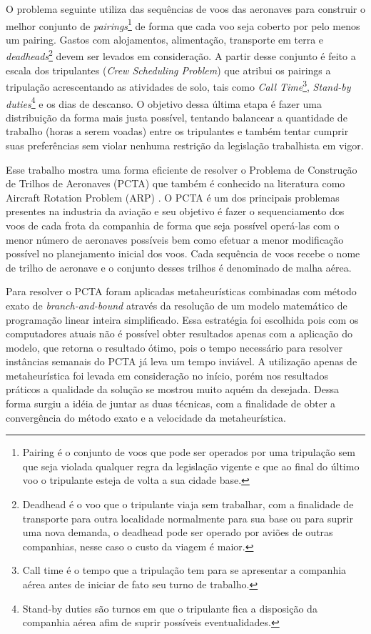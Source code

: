 O problema seguinte utiliza das sequências de voos das aeronaves para construir
o melhor conjunto de \textit{pairings}\footnote{Pairing é o conjunto de voos que
pode ser operados por uma tripulação sem que seja violada qualquer regra da
legislação vigente e que ao final do último voo o tripulante esteja de volta a
sua cidade base.} de forma que cada voo seja coberto por pelo menos um pairing.
Gastos com alojamentos, alimentação, transporte em terra e
\textit{deadheads}\footnote{Deadhead é o voo que o tripulante viaja sem
trabalhar, com a finalidade de transporte para outra localidade normalmente para sua base ou para suprir uma nova demanda, o deadhead pode ser operado por aviões de outras companhias, nesse caso o custo da viagem é maior.} devem ser levados em consideração. A partir desse conjunto é feito a escala dos
tripulantes (\textit{Crew Scheduling Problem}) que atribui os pairings a
tripulação acrescentando as atividades de solo, tais como \textit{Call
Time}\footnote{Call time é o tempo que a tripulação tem para se apresentar a
companhia aérea antes de iniciar de fato seu turno de trabalho.},
\textit{Stand-by duties}\footnote{Stand-by duties
são turnos em que o tripulante fica a disposição da companhia aérea afim de
suprir possíveis eventualidades.} e os dias de descanso. O objetivo dessa última
etapa é fazer uma distribuição da forma mais justa possível, tentando balancear
a quantidade de trabalho (horas a serem voadas) entre os tripulantes e também
tentar cumprir suas preferências sem violar nenhuma restrição da
legislação trabalhista em vigor.
   

Esse trabalho mostra uma forma eficiente de resolver o Problema de Construção
de Trilhos de Aeronaves (PCTA) 
que também é conhecido na literatura como Aircraft Rotation
Problem (ARP) 
. O PCTA é um dos principais problemas presentes na industria da aviação e seu objetivo
é fazer o sequenciamento dos voos de cada frota da companhia de forma que seja
possível operá-las com o menor número de aeronaves possíveis \cite{abiliolivro}
bem como efetuar a menor modificação possível no planejamento inicial dos voos. Cada sequência de voos recebe o nome de trilho de aeronave e o conjunto desses
trilhos é denominado de malha aérea. 

Para resolver o PCTA foram aplicadas metaheurísticas combinadas com
método exato de \textit{branch-and-bound} através da
resolução de um modelo matemático de programação linear inteira simplificado.
Essa estratégia foi escolhida pois com os computadores atuais não é possível obter resultados apenas com a aplicação do modelo, que retorna
o resultado ótimo, pois o tempo necessário para resolver instâncias semanais do
PCTA já leva um tempo inviável. A utilização apenas de metaheurística foi levada
em consideração no início, porém nos resultados práticos a qualidade da solução
se mostrou muito aquém da desejada. Dessa forma surgiu a idéia de juntar as
duas técnicas, com a finalidade de obter a convergência do método exato e a
velocidade da metaheurística.

